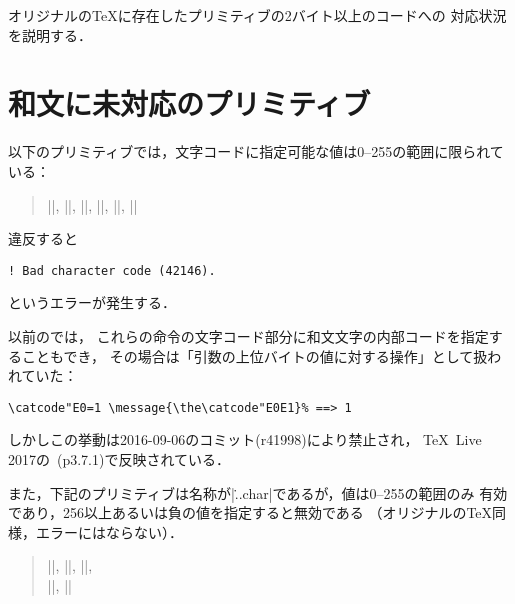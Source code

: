 \documentclass[a4paper,11pt,nomag,dvipdfmx]{jsarticle}
\begin{document}
オリジナルの\TeX に存在したプリミティブの2バイト以上のコードへの
対応状況を説明する．

\section{和文に未対応のプリミティブ}
以下のプリミティブでは，文字コードに指定可能な値は0--255の範囲に限られている：
\begin{quote}
 |\catcode|,
 |\sfcode|,
 |\mathcode|,
 |\delcode|,
 |\lccode|,
 |\uccode|
\end{quote}
違反すると
\begin{verbatim}
! Bad character code (42146).
\end{verbatim}
というエラーが発生する．
\begin{dangerous}
以前の\pTeX では，
これらの命令の文字コード部分に和文文字の内部コードを指定することもでき，
その場合は「引数の上位バイトの値に対する操作」として扱われていた：
\begin{verbatim}
\catcode"E0=1 \message{\the\catcode"E0E1}% ==> 1
\end{verbatim}
しかしこの挙動は2016-09-06のコミット(r41998)により禁止され，
\TeX~Live 2017の\pTeX~(p3.7.1)で反映されている．
\end{dangerous}

また，下記のプリミティブは名称が|\...char|であるが，値は0--255の範囲のみ
有効であり，256以上あるいは負の値を指定すると無効である
（オリジナルの\TeX 同様，エラーにはならない）．
\begin{quote}
 |\endlinechar|,
 |\newlinechar|,
 |\escapechar|,\\
 ||,
 ||
\end{quote}

\end{document}
